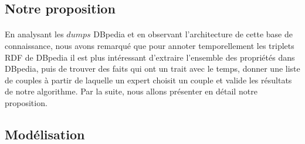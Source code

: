 \documentclass[12pt,a4	]{report}
\begin{document}
\subsection{Notre proposition}
\paragraph{}
En analysant les $dumps$ DBpedia et en observant l'architecture de cette base de connaissance, nous avons remarqué que pour annoter temporellement les triplets RDF de DBpedia il est plus intéressant d'extraire l'ensemble des propriétés dans DBpedia, puis de trouver des faits qui ont un trait avec le temps, donner une liste de couples à partir de laquelle un expert choisit un couple et valide les résultats de notre algorithme. Par la suite, nous allons présenter en détail notre proposition.
\subsection{Modélisation}
\end{document}
